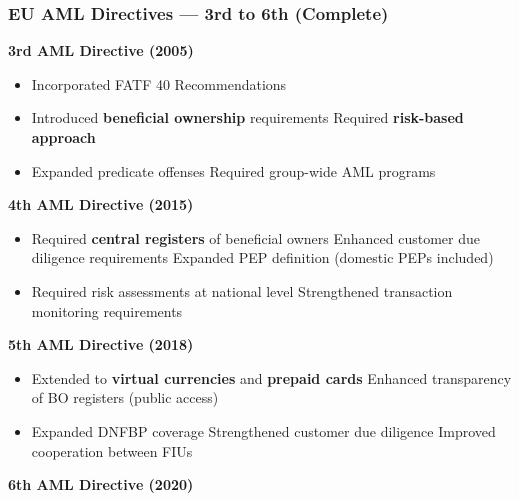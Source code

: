 \documentclass[12pt,aspectratio=169]{beamer}
\renewcommand{\scriptsize}{\fontsize{4.5}{5.5}\selectfont}
\begin{document}
	\begin{frame}
		\frametitle{\fontsize{11}{13}\selectfont \textbf{EU AML Directives — 3rd to 6th (Complete)}}
		\begin{block}{\fontsize{7}{9}\selectfont \textbf{3rd AML Directive (2005)}}
			\scriptsize
			\begin{itemize}
				\item Incorporated FATF 40 Recommendations
				\item Introduced \textbf{beneficial ownership} requirements
			 Required \textbf{risk-based approach}
				\item Expanded predicate offenses
				 Required group-wide AML programs
			\end{itemize}
		\end{block}
		\vspace{0.02cm}
		\begin{block}{\fontsize{7}{9}\selectfont \textbf{4th AML Directive (2015)}}
			\scriptsize
			\begin{itemize}
				\item Required \textbf{central registers} of beneficial owners
			 Enhanced customer due diligence requirements
			 Expanded PEP definition (domestic PEPs included)
				\item Required risk assessments at national level
				 Strengthened transaction monitoring requirements
			\end{itemize}
		\end{block}
		\vspace{0.02cm}
		\begin{block}{\fontsize{7}{9}\selectfont \textbf{5th AML Directive (2018)}}
			\scriptsize
			\begin{itemize}
				\item Extended to \textbf{virtual currencies} and \textbf{prepaid cards}
			 Enhanced transparency of BO registers (public access)
				\item Expanded DNFBP coverage
			 Strengthened customer due diligence
			Improved cooperation between FIUs
			\end{itemize}
		\end{block}
		\vspace{0.02cm}
		\begin{block}{\fontsize{7}{9}\selectfont \textbf{6th AML Directive (2020)}}
			\scriptsize
			\begin{itemize}

\end{itemize}
\end{block}
\end{frame}
\end{document}
